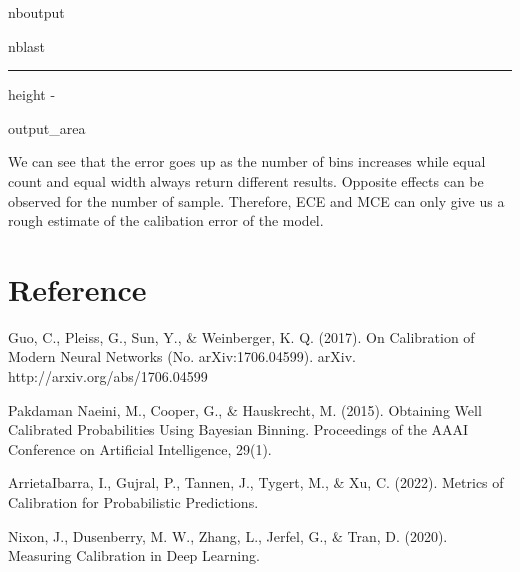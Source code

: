 \documentclass[letterpaper,10pt,english]{sphinxmanual}
\let\sphinxpxdimen\pdfpxdimen\else\newdimen\sphinxpxdimen
\begin{document}
\begin{sphinxuseclass}{nboutput}
\begin{sphinxuseclass}{nblast}
\hrule height -\fboxrule\relax
\vspace{\nbsphinxcodecellspacing}

\makeatletter\setbox\nbsphinxpromptbox\box\voidb@x\makeatother

\begin{nbsphinxfancyoutput}

\begin{sphinxuseclass}{output_area}
\begin{sphinxuseclass}{}
\noindent\sphinxincludegraphics[width=556\sphinxpxdimen,height=453\sphinxpxdimen]{{notebooks_ece_mce_12_1}.png}

\end{sphinxuseclass}
\end{sphinxuseclass}
\end{nbsphinxfancyoutput}

\end{sphinxuseclass}
\end{sphinxuseclass}
\sphinxAtStartPar
We can see that the error goes up as the number of bins increases while equal count and equal width always return different results. Opposite effects can be observed for the number of sample. Therefore, ECE and MCE can only give us a rough estimate of the calibation error of the model.


\section{Reference}
\label{\detokenize{notebooks/ece_mce:Reference}}
\sphinxAtStartPar
Guo, C., Pleiss, G., Sun, Y., \& Weinberger, K. Q. (2017). On Calibration of Modern Neural Networks (No. arXiv:1706.04599). arXiv. http://arxiv.org/abs/1706.04599

\sphinxAtStartPar
Pakdaman Naeini, M., Cooper, G., \& Hauskrecht, M. (2015). Obtaining Well Calibrated Probabilities Using Bayesian Binning. Proceedings of the AAAI Conference on Artificial Intelligence, 29(1). 

\sphinxAtStartPar
Arrieta\sphinxhyphen{}Ibarra, I., Gujral, P., Tannen, J., Tygert, M., \& Xu, C. (2022). Metrics of Calibration for Probabilistic Predictions.

\sphinxAtStartPar
Nixon, J., Dusenberry, M. W., Zhang, L., Jerfel, G., \& Tran, D. (2020). Measuring Calibration in Deep Learning.
\end{document}
